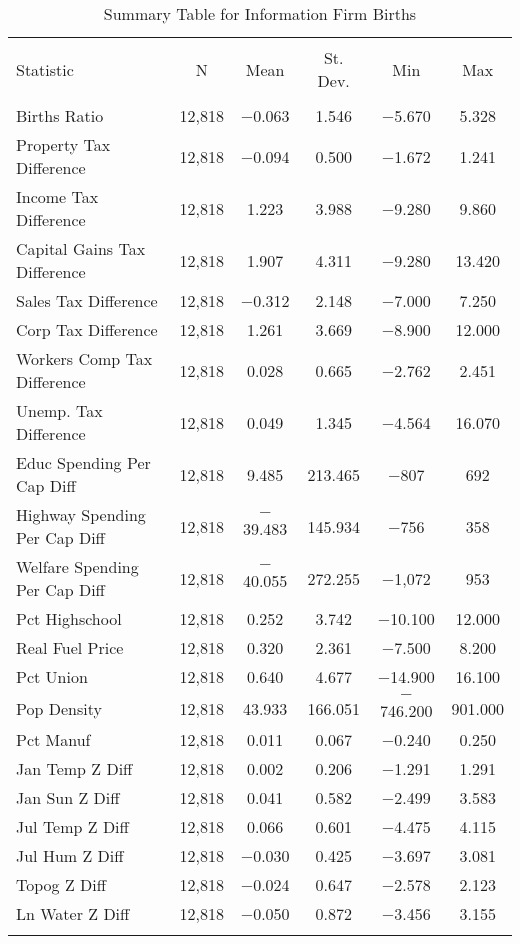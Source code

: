 
\begin{table}[!htbp] \centering 
  \caption{Summary Table for  Information Firm Births} 
  \label{51summary} 
\begin{tabular}{@{\extracolsep{5pt}}lccccc} 
\\[-1.8ex]\hline 
\hline \\[-1.8ex] 
Statistic & \multicolumn{1}{c}{N} & \multicolumn{1}{c}{Mean} & \multicolumn{1}{c}{St. Dev.} & \multicolumn{1}{c}{Min} & \multicolumn{1}{c}{Max} \\ 
\hline \\[-1.8ex] 
Births Ratio & 12,818 & $-$0.063 & 1.546 & $-$5.670 & 5.328 \\ 
Property Tax Difference & 12,818 & $-$0.094 & 0.500 & $-$1.672 & 1.241 \\ 
Income Tax Difference & 12,818 & 1.223 & 3.988 & $-$9.280 & 9.860 \\ 
Capital Gains Tax Difference & 12,818 & 1.907 & 4.311 & $-$9.280 & 13.420 \\ 
Sales Tax Difference & 12,818 & $-$0.312 & 2.148 & $-$7.000 & 7.250 \\ 
Corp Tax Difference & 12,818 & 1.261 & 3.669 & $-$8.900 & 12.000 \\ 
Workers Comp Tax Difference & 12,818 & 0.028 & 0.665 & $-$2.762 & 2.451 \\ 
Unemp. Tax Difference & 12,818 & 0.049 & 1.345 & $-$4.564 & 16.070 \\ 
Educ Spending Per Cap Diff & 12,818 & 9.485 & 213.465 & $-$807 & 692 \\ 
Highway Spending Per Cap Diff & 12,818 & $-$39.483 & 145.934 & $-$756 & 358 \\ 
Welfare Spending Per Cap Diff & 12,818 & $-$40.055 & 272.255 & $-$1,072 & 953 \\ 
Pct Highschool & 12,818 & 0.252 & 3.742 & $-$10.100 & 12.000 \\ 
Real Fuel Price & 12,818 & 0.320 & 2.361 & $-$7.500 & 8.200 \\ 
Pct Union & 12,818 & 0.640 & 4.677 & $-$14.900 & 16.100 \\ 
Pop Density & 12,818 & 43.933 & 166.051 & $-$746.200 & 901.000 \\ 
Pct Manuf & 12,818 & 0.011 & 0.067 & $-$0.240 & 0.250 \\ 
Jan Temp Z Diff & 12,818 & 0.002 & 0.206 & $-$1.291 & 1.291 \\ 
Jan Sun Z Diff & 12,818 & 0.041 & 0.582 & $-$2.499 & 3.583 \\ 
Jul Temp Z Diff & 12,818 & 0.066 & 0.601 & $-$4.475 & 4.115 \\ 
Jul Hum Z Diff & 12,818 & $-$0.030 & 0.425 & $-$3.697 & 3.081 \\ 
Topog Z Diff & 12,818 & $-$0.024 & 0.647 & $-$2.578 & 2.123 \\ 
Ln Water Z Diff & 12,818 & $-$0.050 & 0.872 & $-$3.456 & 3.155 \\ 
\hline \\[-1.8ex] 
\end{tabular} 
\end{table} 
